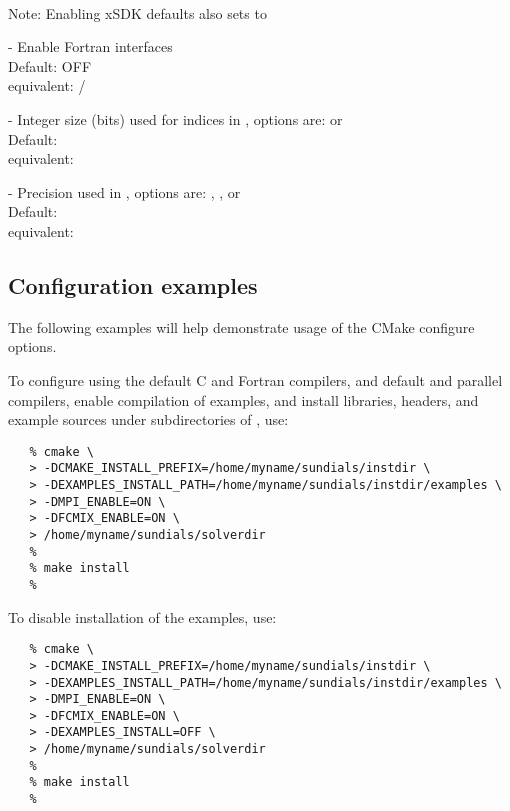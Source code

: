 \begin{description}
  \\
  Note: Enabling xSDK defaults also sets  to 
\item[\id{XSDK\_ENABLE\_FORTRAN}] -
  Enable {\sundials} Fortran interfaces
  \\
  Default: OFF
  \\
  {\sundials} equivalent: /
\item[\id{XSDK\_INDEX\_SIZE}] -
  Integer size (bits) used for indices in {\sundials}, options are:  or 
  \\
  Default: 
  \\
  {\sundials} equivalent: 
\item[\id{XSDK\_PRECISION}] -
  Precision used in {\sundials}, options are: , , or 
  \\
  Default: 
  \\
  {\sundials} equivalent: 
\end{description}




\subsection{Configuration examples}

The following examples will help demonstrate usage of the CMake configure options.

\noindent To configure {\sundials} using the default C and Fortran compilers,
and default  and  parallel compilers,
enable compilation of examples, and install libraries, headers, and
example sources under subdirectories of
, use:

\begin{verbatim}
   % cmake \
   > -DCMAKE_INSTALL_PREFIX=/home/myname/sundials/instdir \
   > -DEXAMPLES_INSTALL_PATH=/home/myname/sundials/instdir/examples \
   > -DMPI_ENABLE=ON \
   > -DFCMIX_ENABLE=ON \
   > /home/myname/sundials/solverdir
   %
   % make install
   %
\end{verbatim}

\noindent To disable installation of the examples, use:
\begin{verbatim}
   % cmake \
   > -DCMAKE_INSTALL_PREFIX=/home/myname/sundials/instdir \
   > -DEXAMPLES_INSTALL_PATH=/home/myname/sundials/instdir/examples \
   > -DMPI_ENABLE=ON \
   > -DFCMIX_ENABLE=ON \
   > -DEXAMPLES_INSTALL=OFF \
   > /home/myname/sundials/solverdir
   %
   % make install
   %
\end{verbatim}

